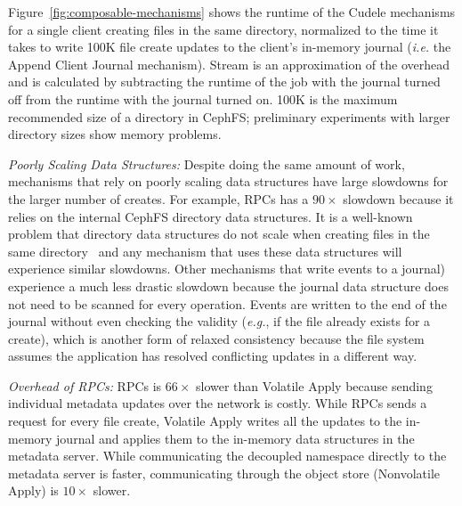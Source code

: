
Figure~\ref{fig:composable-mechanisms} shows the runtime of the Cudele
mechanisms for a single client creating files in the same directory, normalized
to the time it takes to write 100K file create updates to the client's
in-memory journal ({\it i.e.} the Append Client Journal mechanism).
Stream is an approximation of the overhead and is calculated by subtracting
the runtime of the job with the journal turned off from the runtime with the
journal turned on.  100K is the maximum recommended size of a directory in
CephFS; preliminary experiments with larger directory sizes show memory
problems.

{\it Poorly Scaling Data Structures:} Despite doing the same amount of work,
mechanisms that rely on poorly scaling data structures have large slowdowns for
the larger number of creates. For example, RPCs has a \(90\times\) slowdown
because it relies on the internal CephFS directory data structures. It is a
well-known problem that directory data structures do not scale when creating
files in the same directory~\cite{ren:sc2014-indexfs} and any mechanism that
uses these data structures will experience similar slowdowns. Other mechanisms
that write events to a journal) experience a much less drastic slowdown because
the journal data structure does not need to be scanned for every operation.
Events are written to the end of the journal without even checking the validity
({\it e.g.}, if the file already exists for a create), which is another form of
relaxed consistency because the file system assumes the application has
resolved conflicting updates in a different way.

{\it Overhead of RPCs:} RPCs is \(66\times\) slower than Volatile
Apply because sending individual metadata updates over the network is costly.
While RPCs sends a request for every file create, Volatile Apply
writes all the updates to the in-memory journal and applies them to the
in-memory data structures in the metadata server. While communicating the
decoupled namespace directly to the metadata server is faster, communicating
through the object store (Nonvolatile Apply) is \(10\times\) slower.

